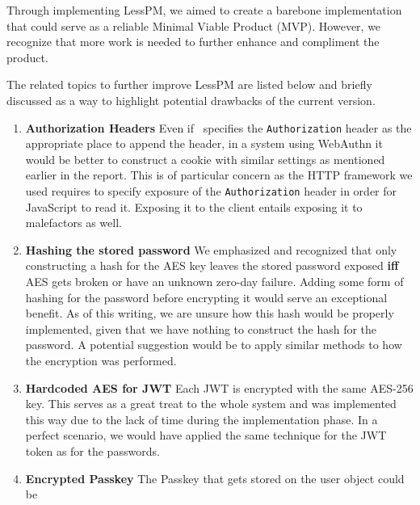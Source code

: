 Through implementing LessPM, we aimed to create a barebone implementation that
could serve as a reliable Minimal Viable Product (MVP).
However, we recognize that more work is needed to further enhance and compliment
the product.

The related topics to further improve LessPM are listed below and briefly
discussed as a way to highlight potential drawbacks of the current version.

    \begin{enumerate}[label=$\blacktriangleright$]
        \item \textbf{Authorization Headers}
        \newline Even if~\cite{RFC7519} specifies the \texttt{Authorization}
        header as the appropriate place to append the header, in a system
        using WebAuthn it would be better to construct a cookie with similar
        settings as mentioned earlier in the report.
        This is of particular concern as the HTTP framework we used requires
        to specify exposure of the \texttt{Authorization} header in order for
        JavaScript to read it.
        Exposing it to the client entails exposing it to malefactors as well.
        \item \textbf{Hashing the stored password}
        \newline We emphasized and recognized that only constructing a hash
        for the AES key leaves the stored password exposed \textbf{iff} AES
        gets broken or have an unknown zero-day failure.
        Adding some form of hashing for the password before encrypting it would
        serve an exceptional benefit.
        As of this writing, we are unsure how this hash would be properly
        implemented, given that we have nothing to construct the hash for the
        password.
        A potential suggestion would be to apply similar methods to how the
        encryption was performed.
        \item \textbf{Hardcoded AES for JWT}
        \newline Each JWT is encrypted with the same AES-256 key.
        This serves as a great treat to the whole system and was implemented
        this way due to the lack of time during the implementation phase.
        In a perfect scenario, we would have applied the same technique for
        the JWT token as for the passwords.
        \item \textbf{Encrypted Passkey}
        \newline The Passkey that gets stored on the user object could be

\end{enumerate}

